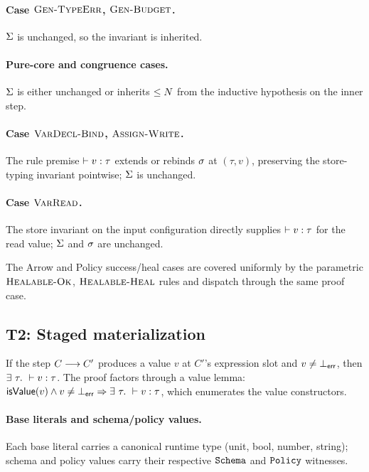 \paragraph{Case $\textsc{Gen-TypeErr}$, $\textsc{Gen-Budget}$.} $\Sigma$ is unchanged, so the invariant is inherited.

\paragraph{Pure-core and congruence cases.} $\Sigma$ is either unchanged or inherits $\le N$ from the inductive hypothesis on the inner step.

\paragraph{Case $\textsc{VarDecl-Bind}$, $\textsc{Assign-Write}$.} The rule premise $\vdash v : \tau$ extends or rebinds $\sigma$ at $(\tau, v)$, preserving the store-typing invariant pointwise; $\Sigma$ is unchanged.

\paragraph{Case $\textsc{VarRead}$.} The store invariant on the input configuration directly supplies $\vdash v : \tau$ for the read value; $\Sigma$ and $\sigma$ are unchanged.

The Arrow and Policy success/heal cases are covered uniformly by the parametric
$\textsc{Healable-Ok}$, $\textsc{Healable-Heal}$ rules and dispatch through
the same proof case.

\subsection{T2: Staged materialization}
\label{app:proof-sound-b}

If the step $C \longrightarrow C'$ produces a value $v$ at $C'$'s expression slot and $v \neq \bot_{\mathsf{err}}$, then $\exists~\tau.\ \vdash v : \tau$. The proof factors through a value lemma: $\mathsf{isValue}(v) \wedge v \neq \bot_{\mathsf{err}} \Rightarrow \exists~\tau.\ \vdash v : \tau$, which enumerates the value constructors.

\paragraph{Base literals and schema/policy values.} Each base literal carries a canonical runtime type (unit, bool, number, string); schema and policy values carry their respective $\texttt{Schema}$ and $\texttt{Policy}$ witnesses.


